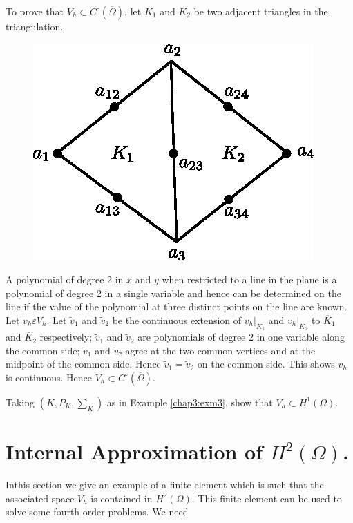 To prove that $V_h\subset C^\circ(\overline{\Omega})$, let $K_1$ and
$K_2$ be two adjacent triangles in the triangulation. 
\begin{figure}[H]
\centering
\includegraphics{figure/fig3.7.eps}
\caption{}\label{fig3.7}
\end{figure}


A polynomial of degree 2 in $x$ and $y$ when restricted to a line in
the plane is a polynomial of degree 2 in a single variable and hence
can be determined on the line if the value of the polynomial at three
distinct points on the line are known. Let $v_h\varepsilon V_h$. Let
$\tilde{v}_1$ and $\tilde{v}_2$ be the continuous extension of
$v_h|_{K_1}$ and $v_h|_{K_2}$ to $\overline{K}_1$ and $\overline{K}_2$
respectively; $\tilde{v}_1$ and $\tilde{v}_2$ are polynomials of
degree 2 in one variable along the common side; $\tilde{v}_1$ and
$\tilde{v}_2$ agree at the two common vertices and at the midpoint of
the common side. Hence $\tilde{v}_1=\tilde{v}_2$ on the common
side. This shows $v_h$ is continuous. Hence $V_h\subset
C^\circ(\overline{\Omega})$. 

\setcounter{exercise}{0}
\begin{exercise}\label{chap3:Exr1}
Taking $(K, P_K, \sum_K)$ as in Example \ref{chap3:exm3}, show that
$V_h\subset H^1(\Omega)$.
\end{exercise}

\section{Internal Approximation of $H^2(\Omega)$.}\label{chap3:ssec3.4}
 In\pageoriginale this section we give an
example of a finite element which is such that the associated space
$V_h$ is contained in $H^2(\Omega)$. This finite element can be used
to solve some fourth order problems. We need 

